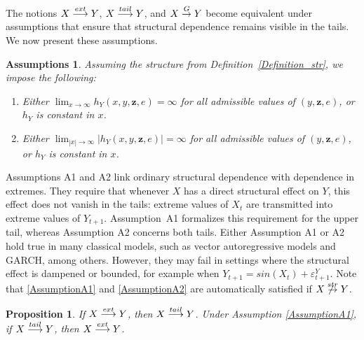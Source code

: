 \documentclass[a4paper,11pt]{article}
\newtheorem{proposition}{Proposition}
\newtheorem*{assumptions*}{Assumptions}
\newcommand{\toverset}[2]{\overset{{\rm #1}}{#2}}
\begin{document}
The notions \(\textbf{X}\toverset{ext}{\longrightarrow}\textbf{Y}\),
\(\textbf{X}\toverset{tail}{\longrightarrow}\textbf{Y}\), and
\(\textbf{X}\toverset{G}{\to}\textbf{Y}\) become equivalent under assumptions that
ensure that structural dependence remains visible in the tails. We now present these
assumptions. 


\begin{assumptions*}
Assuming the structure from Definition~\ref{Definition_str}, we impose the following:
\begin{enumerate}[label=(A\arabic*), ref=A\arabic*]
    \item \label{AssumptionA1}
    Either
    \(
        \lim_{x\to\infty} h_Y(x,y,\mathbf z,e)=\infty
    \)
    for all admissible values of \((y,\mathbf z,e)\), or \(h_Y\)
    is constant in \(x\).

    \item \label{AssumptionA2}
    Either
    \(
        \lim_{|x|\to\infty} \big|h_Y(x,y,\mathbf z,e)\big|=\infty
    \)
    for all admissible values of \((y,\mathbf z,e)\), or \(h_Y\)
    is constant in \(x\).
\end{enumerate}
\end{assumptions*}

Assumptions A1 and A2 link ordinary structural dependence with dependence in extremes. They require that whenever \(X\) has a direct structural effect on \(Y\), this effect does not vanish in the tails: extreme values of \(X_t\) are transmitted into extreme values of \(Y_{t+1}\). Assumption~A1 formalizes this requirement for the upper tail, whereas Assumption A2 concerns both tails. 
Either Assumption A1 or A2 hold true in many classical models, such as vector autoregressive models \citep[VAR,][]{MVT_timeseries_SPRINGER} and GARCH, among others. However, they may fail in settings where the structural effect is dampened or bounded, for example when
\(Y_{t+1} = sin(X_{t})+\varepsilon_{t+1}^Y\). Note that \ref{AssumptionA1} and \ref{AssumptionA2} are automatically satisfied if $\textbf{X}\not\toverset{str}{\to} \textbf{Y}$.

\begin{proposition}\label{Proposition_CTC_iff_1}
If $\textbf{X}\toverset{ext}{\longrightarrow}\textbf{Y}$, then $\textbf{X}\toverset{tail}{\longrightarrow}\textbf{Y}$. Under Assumption \ref{AssumptionA1},  if $\textbf{X}\toverset{tail}{\longrightarrow}\textbf{Y}$, then $\textbf{X}\toverset{ext}{\longrightarrow}\textbf{Y}$. 
\end{proposition}
\end{document}
